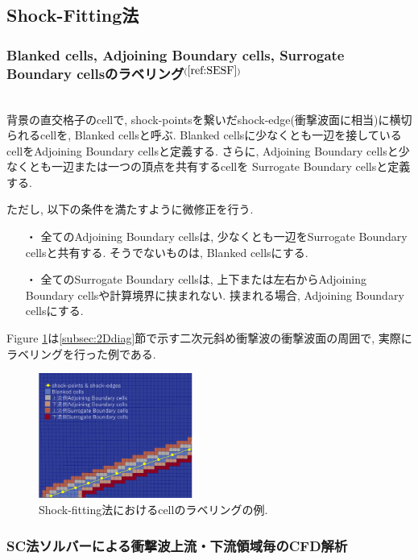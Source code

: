 \documentclass[a4j]{jarticle}
\begin{document}
\subsection{Shock-Fitting法} \label{subsec:SF}

\subsubsection{Blanked cells, Adjoining Boundary cells, Surrogate Boundary cellsのラベリング$^{(\ref{ref:SESF})}$} \label{subsubsec:boundary}
\mbox{}\\[-3.0ex] 

背景の直交格子のcellで, shock-pointsを繋いだshock-edge(衝撃波面に相当)に横切られるcellを,
Blanked cellsと呼ぶ. 
Blanked cellsに少なくとも一辺を接しているcellをAdjoining Boundary cellsと定義する.
さらに, Adjoining Boundary cellsと少なくとも一辺または一つの頂点を共有するcellを
Surrogate Boundary cellsと定義する.

ただし, 以下の条件を満たすように微修正を行う.
\begin{itemize}
  \item[・]  全てのAdjoining Boundary cellsは, 少なくとも一辺をSurrogate Boundary cellsと共有する.
  そうでないものは, Blanked cellsにする.
  \item[・]  全てのSurrogate Boundary cellsは, 上下または左右からAdjoining Boundary cellsや計算境界に挟まれない.
  挟まれる場合, Adjoining Boundary cellsにする.
\end{itemize}
Figure \ref{fig:grouping}は\ref{subsec:2Ddiag}節で示す二次元斜め衝撃波の衝撃波面の周囲で, 実際にラベリングを行った例である.
\begin{figure}[h]
    \begin{center}
        \includegraphics[width=0.45\textwidth]{grouping.pdf}
    \end{center}
    \caption{Shock-fitting法におけるcellのラベリングの例.}
    \label{fig:grouping}
\end{figure}
\subsubsection{SC法ソルバーによる衝撃波上流・下流領域毎のCFD解析} \label{subsubsec:sc}
\mbox{}\\[-3.0ex] 
\end{document}
